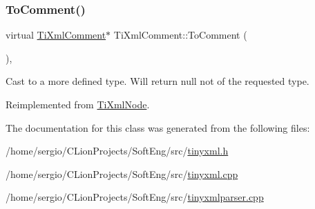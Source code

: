 \subsubsection{\texorpdfstring{To\+Comment()}{ToComment()}\hspace{0.1cm}{\footnotesize\ttfamily [2/2]}}
{\footnotesize\ttfamily virtual \hyperlink{class_ti_xml_comment}{Ti\+Xml\+Comment}$\ast$ Ti\+Xml\+Comment\+::\+To\+Comment (\begin{DoxyParamCaption}{ }\end{DoxyParamCaption})\hspace{0.3cm}{\ttfamily [inline]}, {\ttfamily [virtual]}}



Cast to a more defined type. Will return null not of the requested type. 



Reimplemented from \hyperlink{class_ti_xml_node_a383e06a0787f7063953934867990f849}{Ti\+Xml\+Node}.



The documentation for this class was generated from the following files\+:\begin{DoxyCompactItemize}
\item 
/home/sergio/\+C\+Lion\+Projects/\+Soft\+Eng/src/\hyperlink{tinyxml_8h}{tinyxml.\+h}\item 
/home/sergio/\+C\+Lion\+Projects/\+Soft\+Eng/src/\hyperlink{tinyxml_8cpp}{tinyxml.\+cpp}\item 
/home/sergio/\+C\+Lion\+Projects/\+Soft\+Eng/src/\hyperlink{tinyxmlparser_8cpp}{tinyxmlparser.\+cpp}\end{DoxyCompactItemize}

